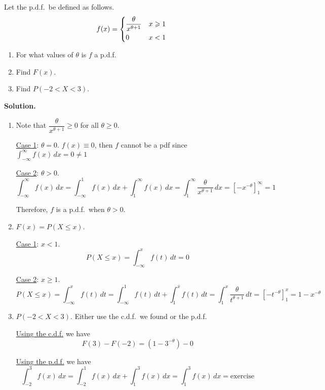 \begin{Example}{}{}
    Let the p.d.f.\ be defined as follows.
    \[ f(x)=\begin{dcases}
            \frac{\theta}{x^{\theta+1}} & x\geqslant 1 \\
            0                           & x<1
        \end{dcases} \]
    \begin{enumerate}[label=(\roman*)]
        \item For what values of $ \theta $ is $ f $ a p.d.f.
        \item Find $ F(x) $.
        \item Find $ P(-2<X<3) $.
    \end{enumerate}
    \textbf{Solution.}

    \begin{enumerate}[label=(\roman*)]
        \item Note that $ \dfrac{\theta}{x^{\theta+1}} \geqslant 0 $
              for all $ \theta\geqslant 0 $.

              \underline{Case 1}: $ \theta=0 $. $ f(x)\equiv 0 $, then $ f $
              cannot be a pdf since $ \int_{-\infty}^{\infty} f(x)\, d{x}=0\neq 1 $

              \underline{Case 2}: $ \theta>0 $.
              \[ \int_{-\infty}^{\infty} f(x)\, d{x}=\int_{-\infty}^{1} f(x)\, d{x}
                  +\int_{1}^{\infty} f(x)\, d{x}=\int_{1}^{\infty} \frac{\theta}{x^{\theta+1}}\, d{x}
                  =\left[ -x^{-\theta} \right]_1^\infty=1 \]

              Therefore, $ f $ is a p.d.f.\ when $ \theta>0 $.

        \item $ F(x)=P(X\leqslant x) $.

              \underline{Case 1}: $ x<1 $.
              \[ P(X\leqslant x)=\int_{-\infty}^{x} f(t)\, d{t} =0 \]

              \underline{Case 2}:  $ x\geqslant 1 $.
              \[ P(X\leqslant x)=\int_{-\infty}^{x} f(t)\, d{t}
                  =\int_{-\infty}^{1} f(t)\, d{t} +\int_{1}^{x} f(t)\, d{t}
                  =\int_{1}^{x} \frac{\theta}{t^{\theta+1}} \, d{t}=\left[ -t^{-\theta} \right]_1^x=
                  1-x^{-\theta}  \]
        \item $ P(-2<X<3) $. Either use the c.d.f.\ we found or the p.d.f.

              \underline{Using the c.d.f.} we have
              \[ F(3)-F(-2)=(1-3^{-\theta})-0 \]

              \underline{Using the p.d.f.} we have
              \[ \int_{-2}^{3} f(x)\, d{x}=
                  \int_{-2}^{1} f(x)\, d{x} +\int_{1}^{3} f(x)\, d{x}
                  =\int_{1}^{3} f(x)\, d{x}=\text{exercise} \]
    \end{enumerate}

\end{Example}

